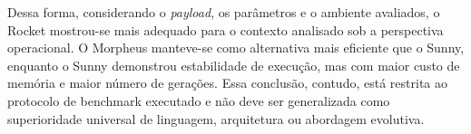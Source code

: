 Dessa forma, considerando o \textit{payload}, os parâmetros e o ambiente avaliados, o Rocket mostrou-se mais adequado para o contexto analisado sob a perspectiva operacional. O Morpheus manteve-se como alternativa mais eficiente que o Sunny, enquanto o Sunny demonstrou estabilidade de execução, mas com maior custo de memória e maior número de gerações. Essa conclusão, contudo, está restrita ao protocolo de benchmark executado e não deve ser generalizada como superioridade universal de linguagem, arquitetura ou abordagem evolutiva.
